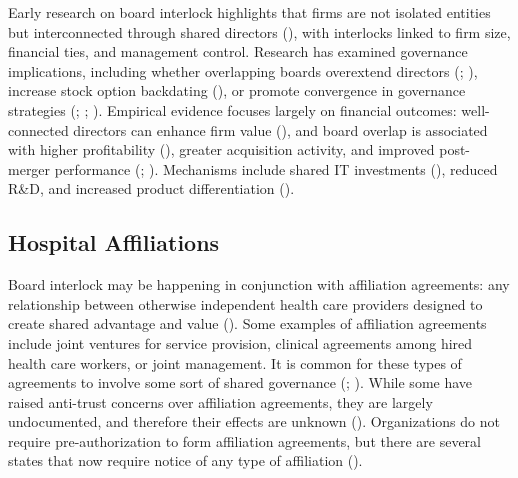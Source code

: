 \documentclass[12pt]{article}
\begin{document}
    Early research on board interlock highlights that firms are not isolated entities but interconnected through shared directors (\cite{dooley1969interlocking}), with interlocks linked to firm size, financial ties, and management control. Research has examined governance implications, including whether overlapping boards overextend directors (\cite{ferris2003too}; \cite{field2013busy}), increase stock option backdating (\cite{bizjak2009option}), or promote convergence in governance strategies (\cite{bouwman2011corporate}; \cite{chiu2013board}; \cite{cai2014board}). Empirical evidence focuses largely on financial outcomes: well-connected directors can enhance firm value (\cite{baran2017director}), and board overlap is associated with higher profitability (\cite{geng2021does}), greater acquisition activity, and improved post-merger performance (\cite{schonlau2009board}; \cite{cai2012board}). Mechanisms include shared IT investments (\cite{cheng2021social}), reduced R\&D, and increased product differentiation (\cite{geng2021does}).


    \subsection{Hospital Affiliations}\label{sec:hospaffil}

    Board interlock may be happening in conjunction with affiliation agreements: any relationship between otherwise independent health care providers designed to create shared advantage and value (\cite{aha2018affiliations}). Some examples of affiliation agreements include joint ventures for service provision, clinical agreements among hired health care workers, or joint management. It is common for these types of agreements to involve some sort of shared governance (\cite{aha2018affiliations}; \cite{natlawreview2023ftc}). While some have raised anti-trust concerns over affiliation agreements, they are largely undocumented, and therefore their effects are unknown (\cite{rand2023consolidation}). Organizations do not require pre-authorization to form affiliation agreements, but there are several states that now require notice of any type of affiliation (\cite{ncsl2024healthcare}). 
\end{document}
